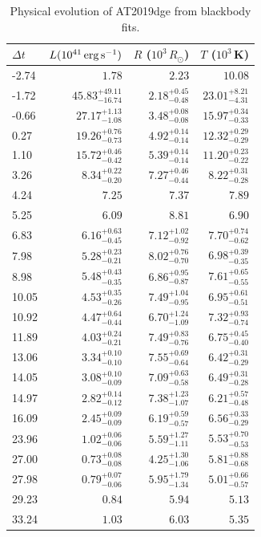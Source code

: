 \documentclass[twocolumn]{aastex63}
\begin{document}
\begin{CJK*}{UTF8}{gbsn}
\begin{table}[!htbp] 
	\centering 
	\caption{Physical evolution of AT2019dge from blackbody fits.} 
	\begin{tabular}{lrrr} 
		\hline 
		$\Delta t$ & $L (10^{41} \,{\rm erg\,s^{-1}})$ & $R$ ($10^{3}\,R_\odot$) & $T$ ($10^3$\,K) \\ 
		\hline
		-2.74 & $1.78$ & $2.23$ & $10.08$  \\
		-1.72 & $45.83^{+49.11}_{-16.74}$ &$2.18^{+0.45}_{-0.48}$ &$23.01^{+8.21}_{-4.31}$  \\
		-0.66 & $27.17^{+1.13}_{-1.08}$ &$3.48^{+0.08}_{-0.08}$ &$15.97^{+0.34}_{-0.33}$  \\
		0.27 & $19.26^{+0.76}_{-0.73}$ &$4.92^{+0.14}_{-0.14}$ &$12.32^{+0.29}_{-0.29}$  \\
		1.10 & $15.72^{+0.46}_{-0.42}$ &$5.39^{+0.14}_{-0.14}$ &$11.20^{+0.23}_{-0.22}$  \\
		3.26 & $8.34^{+0.22}_{-0.20}$ &$7.27^{+0.46}_{-0.44}$ &$8.22^{+0.31}_{-0.28}$  \\
		4.24 & $7.25$ & $7.37$ & $7.89$  \\
		5.25 & $6.09$ & $8.81$ & $6.90$  \\
		6.83 & $6.16^{+0.63}_{-0.45}$ &$7.12^{+1.02}_{-0.92}$ &$7.70^{+0.74}_{-0.62}$  \\
		7.98 & $5.28^{+0.23}_{-0.21}$ &$8.02^{+0.76}_{-0.70}$ &$6.98^{+0.39}_{-0.35}$  \\
		8.98 & $5.48^{+0.43}_{-0.35}$ &$6.86^{+0.95}_{-0.87}$ &$7.61^{+0.65}_{-0.55}$  \\
		10.05 & $4.53^{+0.35}_{-0.26}$ &$7.49^{+1.04}_{-0.95}$ &$6.95^{+0.61}_{-0.51}$  \\
		10.92 & $4.47^{+0.64}_{-0.44}$ &$6.70^{+1.24}_{-1.09}$ &$7.32^{+0.93}_{-0.74}$  \\
		11.89 & $4.03^{+0.24}_{-0.21}$ &$7.49^{+0.83}_{-0.76}$ &$6.75^{+0.45}_{-0.40}$  \\
		13.06 & $3.34^{+0.10}_{-0.10}$ &$7.55^{+0.69}_{-0.64}$ &$6.42^{+0.31}_{-0.29}$  \\
		14.05 & $3.08^{+0.10}_{-0.09}$ &$7.09^{+0.63}_{-0.58}$ &$6.49^{+0.31}_{-0.28}$  \\
		14.97 & $2.82^{+0.14}_{-0.12}$ &$7.38^{+1.23}_{-1.07}$ &$6.21^{+0.57}_{-0.48}$  \\
		16.09 & $2.45^{+0.09}_{-0.09}$ &$6.19^{+0.59}_{-0.57}$ &$6.56^{+0.33}_{-0.29}$  \\
		23.96 & $1.02^{+0.06}_{-0.06}$ &$5.59^{+1.27}_{-1.11}$ &$5.53^{+0.70}_{-0.53}$  \\
		27.00 & $0.73^{+0.08}_{-0.08}$ &$4.25^{+1.30}_{-1.06}$ &$5.81^{+0.88}_{-0.68}$  \\
		27.98 & $0.79^{+0.07}_{-0.06}$ &$5.95^{+1.79}_{-1.34}$ &$5.01^{+0.66}_{-0.57}$  \\
		29.23 & $0.84$ & $5.94$ & $5.13$  \\
		33.24 & $1.03$ & $6.03$ & $5.35$  \\
		\hline 
	\end{tabular} 
	\label{tab:bbfit} 
\end{table} 


\end{CJK*}
\end{document}
